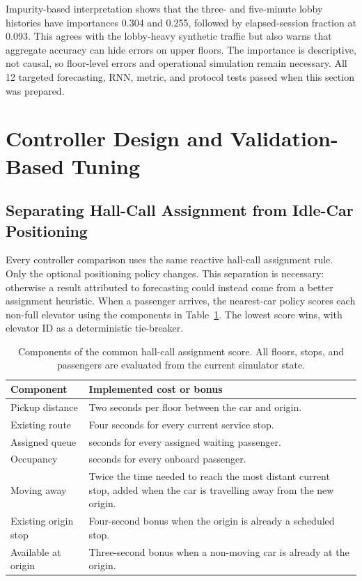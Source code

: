 \documentclass[12pt]{article}
\begin{document}
Impurity-based interpretation shows that the three- and five-minute lobby
histories have importances 0.304 and 0.255, followed by elapsed-session fraction
at 0.093. This agrees with the lobby-heavy synthetic traffic but also warns
that aggregate accuracy can hide errors on upper floors. The importance is
descriptive, not causal, so floor-level errors and operational simulation
remain necessary. All 12 targeted forecasting, RNN, metric, and protocol tests
passed when this section was prepared.

\section{Controller Design and Validation-Based Tuning}
\label{sec:controller-methodology}

\subsection{Separating Hall-Call Assignment from Idle-Car Positioning}

Every controller comparison uses the same reactive hall-call assignment rule.
Only the optional positioning policy changes. This separation is necessary:
otherwise a result attributed to forecasting could instead come from a better
assignment heuristic. When a passenger arrives, the nearest-car policy scores
each non-full elevator using the components in
Table~\ref{tab:assignment-score}. The lowest score wins, with elevator ID as a
deterministic tie-breaker.

\begin{table}[H]
  \centering
  \caption{Components of the common hall-call assignment score. All floors,
  stops, and passengers are evaluated from the current simulator state.}
  \label{tab:assignment-score}
  \begin{tabular}{@{}>{\raggedright\arraybackslash}p{}
    >{\raggedright\arraybackslash}p{}@{}}
    \toprule
    Component & Implemented cost or bonus \\
    \midrule
    Pickup distance & Two seconds per floor between the car and origin. \\
    Existing route & Four seconds for every current service stop. \\
    Assigned queue & 0.75 seconds for every assigned waiting passenger. \\
    Occupancy & 0.5 seconds for every onboard passenger. \\
    Moving away & Twice the time needed to reach the most distant current
      stop, added when the car is travelling away from the new origin. \\
    Existing origin stop & Four-second bonus when the origin is already a
      scheduled stop. \\
    Available at origin & Three-second bonus when a non-moving car is already
      at the origin. \\
    \bottomrule
  \end{tabular}
\end{table}
\end{document}
